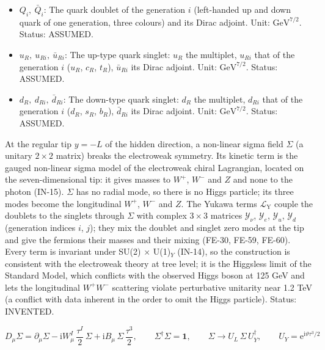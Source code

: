\documentclass[
  10pt,
]{article}
\begin{document}
\begin{itemize}
  \(\mu_R\), \(\tau_R\)). Unit: \(\mathrm{GeV}^{7/2}\). Status: ASSUMED.
\item
  \(Q_i,\ \bar Q_i\): The quark doublet of the generation \(i\)
  (left-handed up and down quark of one generation, three colours) and
  its Dirac adjoint. Unit: \(\mathrm{GeV}^{7/2}\). Status: ASSUMED.
\item
  \(u_R,\ u_{Ri},\ \bar u_{Ri}\): The up-type quark singlet: \(u_R\) the
  multiplet, \(u_{Ri}\) that of the generation \(i\) (\(u_R\), \(c_R\),
  \(t_R\)), \(\bar u_{Ri}\) its Dirac adjoint. Unit:
  \(\mathrm{GeV}^{7/2}\). Status: ASSUMED.
\item
  \(d_R,\ d_{Ri},\ \bar d_{Ri}\): The down-type quark singlet: \(d_R\)
  the multiplet, \(d_{Ri}\) that of the generation \(i\) (\(d_R\),
  \(s_R\), \(b_R\)), \(\bar d_{Ri}\) its Dirac adjoint. Unit:
  \(\mathrm{GeV}^{7/2}\). Status: ASSUMED.
\end{itemize}

At the regular tip \(y = -L\) of the hidden direction, a non-linear
sigma field \(\Sigma\) (a unitary \(2 \times 2\) matrix) breaks the
electroweak symmetry. Its kinetic term is the gauged non-linear sigma
model of the electroweak chiral Lagrangian, located on the
seven-dimensional tip: it gives masses to \(W^+\), \(W^-\) and \(Z\) and
none to the photon (IN-15). \(\Sigma\) has no radial mode, so there is
no Higgs particle; its three modes become the longitudinal \(W^+\),
\(W^-\) and \(Z\). The Yukawa terms \(\mathcal{L}_{\mathrm{Y}}\) couple
the doublets to the singlets through \(\Sigma\) with complex
\(3 \times 3\) matrices \(\mathcal{Y}_\nu\), \(\mathcal{Y}_e\),
\(\mathcal{Y}_u\), \(\mathcal{Y}_d\) (generation indices \(i\), \(j\));
they mix the doublet and singlet zero modes at the tip and give the
fermions their masses and their mixing (FE-30, FE-59, FE-60). Every term
is invariant under SU(2) \(\times\) U(1)\(_Y\) (IN-14), so the
construction is consistent with the electroweak theory at tree level; it
is the Higgsless limit of the Standard Model, which conflicts with the
observed Higgs boson at 125 GeV and lets the longitudinal \(W^+W^-\)
scattering violate perturbative unitarity near 1.2 TeV (a conflict with
data inherent in the order to omit the Higgs particle). Status:
INVENTED.

\[
D_\mu\Sigma = \partial_\mu\Sigma - \mathrm{i}W^I_\mu\,\frac{\tau^I}{2}\,\Sigma +
 \mathrm{i}B_\mu\,\Sigma\,\frac{\tau^3}{2},\qquad
\Sigma^\dagger\Sigma = \mathbf{1},\qquad \Sigma \to U_L\,\Sigma\,U_Y^\dagger,\qquad
U_Y = \mathrm{e}^{\mathrm{i}\vartheta\tau^3/2} \tag{IN-14}
\]
\end{document}
